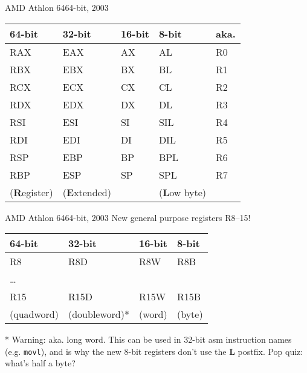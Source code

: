 \documentclass[table,xetex,12pt,aspectratio=169]{beamer}
\begin{document}
\begin{frame}{AMD Athlon 64}{64-bit, 2003}
\begin{tabularx}{\textwidth}{XXXXl}
64-bit & 32-bit & 16-bit & 8-bit & aka. \\
\hline
RAX & EAX & AX & AL & R0 \\
RBX & EBX & BX & BL & R1 \\
RCX & ECX & CX & CL &R2 \\
RDX & EDX & DX & DL &R3 \\
\hline
RSI & ESI & SI & SIL & R4 \\
RDI & EDI & DI & DIL & R5 \\
RSP & EBP & BP & BPL & R6 \\
RBP & ESP & SP & SPL & R7 \\
\hline
(\textbf{R}egister) & (\textbf{E}xtended) & & (\textbf{L}ow byte) & \\
\end{tabularx}
\end{frame}

\begin{frame}{AMD Athlon 64}{64-bit, 2003}
New general purpose registers R8--15!
\vfill
\begin{tabularx}{\textwidth}{XXXX}
64-bit & 32-bit & 16-bit & 8-bit \\
\hline
R8 & R8D & R8W & R8B \\
\multicolumn{4}{l}{\ldots} \\
R15 & R15D & R15W & R15B \\
\hline
(quadword) & (doubleword)* & (word) & (byte) \\
\end{tabularx}
\vfill
* Warning: aka. long word. This can be used in 32-bit asm instruction names (e.g. \texttt{movl}), and is why the new 8-bit registers don't use the \textbf{L} postfix.
\vfill\pause
\alert{Pop quiz: what's half a byte?}
\end{frame}
\end{document}

